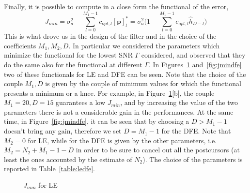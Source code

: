 \documentclass[10pt]{article}
\begin{document}
Finally, it is possible to compute in a close form the functional of the error, 
\begin{equation}
	J_{min} = \sigma_a^2 - \sum_{l=0}^{M_1-1} c_{opt, l}[\mathbf{p}]^*_l = \sigma_a^2\bigg( 1 - \sum_{l=0}^{M_1-1}c_{opt, l}\hat{h}_{D-l} \bigg)
\end{equation}
This is what drove us in the design of the filter and in the choice of the coefficients $M_1, M_2, D$. In particular we considered the parameters which minimize the functional for the lowest SNR $\Gamma$ considered, and observed that they do the same also for the functional at different $\Gamma$. In Figures~\ref{fig:jminle} and~\ref{fig:jmindfe} two of these functionals for LE and DFE can be seen. Note that the choice of the couple $M_1, D$ is given by the couple of minimum values for which the functional presents a minimum or a knee. For example, in Figure~\ref{fig:jminle}[b], the couple $M_1 = 20, D = 15$ guarantees a low $J_{min}$, and by increasing the value of the two parameters there is not a considerable gain in the performances. At the same time, in Figure~\ref{fig:jmindfe}, it can be seen that by choosing a $D > M_1 - 1$ doesn't bring any gain, therefore we set $D = M_1 - 1$ for the DFE. Note that $M_2 = 0$ for LE, while for the DFE is given by the other parameters, i.e. $M_2 = N_2 + M_1 - 1 - D$ in order to be sure to cancel out all the postcursors (at least the ones accounted by the estimate of $N_2$). The choice of the parameters is reported in Table~\ref{table:ledfe}. 


\begin{figure}
	\centering
	\caption{$J_{min}$ for LE}
	\label{fig:jminle}
\end{figure}
\end{document}
